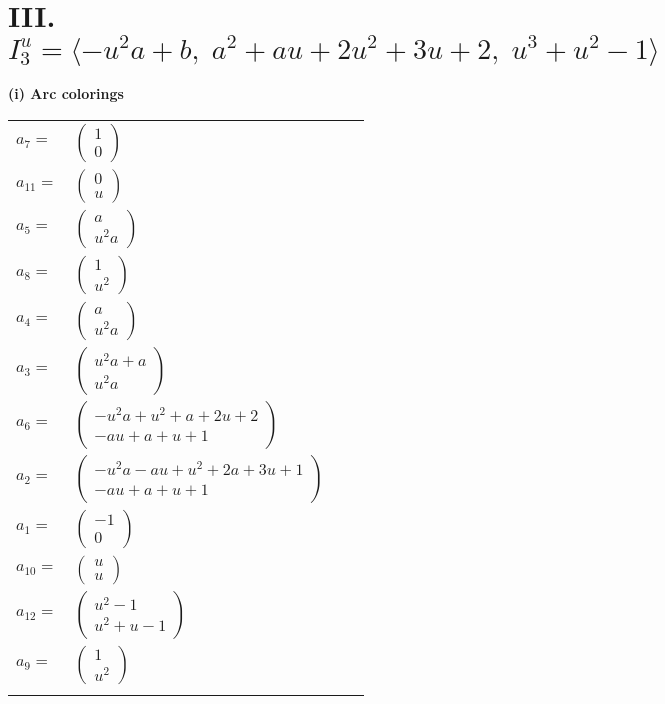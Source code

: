 \documentclass[1p]{elsarticle_modified}
\theoremstyle{definition}
\begin{document}
\centering \section*{III. $I^u_{3}= \langle - u^2 a+b,\;a^2+a u+2 u^2+3 u+2,\;u^3+u^2-1 \rangle$}
\flushleft \textbf{(i) Arc colorings}\\
\begin{tabular}{m{7pt} m{180pt} m{7pt} m{180pt} }
\flushright $a_{7}=$&$\begin{pmatrix}1\\0\end{pmatrix}$ \\
\flushright $a_{11}=$&$\begin{pmatrix}0\\u\end{pmatrix}$ \\
\flushright $a_{5}=$&$\begin{pmatrix}a\\u^2 a\end{pmatrix}$ \\
\flushright $a_{8}=$&$\begin{pmatrix}1\\u^2\end{pmatrix}$ \\
\flushright $a_{4}=$&$\begin{pmatrix}a\\u^2 a\end{pmatrix}$ \\
\flushright $a_{3}=$&$\begin{pmatrix}u^2 a+a\\u^2 a\end{pmatrix}$ \\
\flushright $a_{6}=$&$\begin{pmatrix}- u^2 a+u^2+a+2 u+2\\- a u+a+u+1\end{pmatrix}$ \\
\flushright $a_{2}=$&$\begin{pmatrix}- u^2 a- a u+u^2+2 a+3 u+1\\- a u+a+u+1\end{pmatrix}$ \\
\flushright $a_{1}=$&$\begin{pmatrix}-1\\0\end{pmatrix}$ \\
\flushright $a_{10}=$&$\begin{pmatrix}u\\u\end{pmatrix}$ \\
\flushright $a_{12}=$&$\begin{pmatrix}u^2-1\\u^2+u-1\end{pmatrix}$ \\
\flushright $a_{9}=$&$\begin{pmatrix}1\\u^2\end{pmatrix}$\\&\end{tabular}
\end{document}
